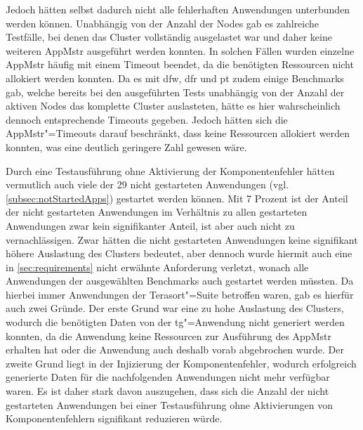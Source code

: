 Jedoch hätten selbst dadurch \uU nicht alle fehlerhaften Anwendungen unterbunden werden können.
Unabhängig von der Anzahl der Nodes gab es zahlreiche Testfälle, bei denen das Cluster vollständig ausgelastet war und daher keine weiteren \gls{AppMstr} ausgeführt werden konnten.
In solchen Fällen wurden einzelne \gls{AppMstr} häufig mit einem Timeout beendet, da die benötigten Ressourcen nicht allokiert werden konnten.
Da es mit \acrlong{dfw}, \acrlong{dfr} und \acrlong{pt} zudem einige Benchmarks gab, welche bereits bei den ausgeführten Tests unabhängig von der Anzahl der aktiven Nodes das komplette Cluster auslasteten, hätte es hier wahrscheinlich dennoch entsprechende Timeouts gegeben.
Jedoch hätten sich die \gls{AppMstr}"=Timeouts darauf beschränkt, dass keine Ressourcen allokiert werden konnten, was eine deutlich geringere Zahl gewesen wäre.

Durch eine Testausführung ohne Aktivierung der Komponentenfehler hätten vermutlich auch viele der 29 nicht gestarteten Anwendungen (vgl. \cref{subsec:notStartedApps}) gestartet werden können.
Mit 7 Prozent ist der Anteil der nicht gestarteten Anwendungen im Verhältnis zu allen gestarteten Anwendungen zwar kein signifikanter Anteil, ist aber auch nicht zu vernachlässigen.
Zwar hätten die nicht gestarteten Anwendungen keine signifikant höhere Auslastung des Clusters bedeutet, aber dennoch wurde hiermit auch eine in \cref{sec:requirements} nicht erwähnte Anforderung verletzt, wonach alle Anwendungen der ausgewählten Benchmarks auch gestartet werden müssten.
Da hierbei immer Anwendungen der Terasort"=Suite betroffen waren, gab es hierfür auch zwei Gründe.
Der erste Grund war eine zu hohe Auslastung des Clusters, wodurch die benötigten Daten von der \acrlong{tg}"=Anwendung nicht generiert werden konnten, da die Anwendung keine Ressourcen zur Ausführung des \gls{AppMstr} erhalten hat oder die Anwendung auch deshalb vorab abgebrochen wurde.
Der zweite Grund liegt in der Injizierung der Komponentenfehler, wodurch erfolgreich generierte Daten für die nachfolgenden Anwendungen nicht mehr verfügbar waren.
Es ist daher stark davon auszugehen, dass sich die Anzahl der nicht gestarteten Anwendungen bei einer Testausführung ohne Aktivierungen von Komponentenfehlern signifikant reduzieren würde.

